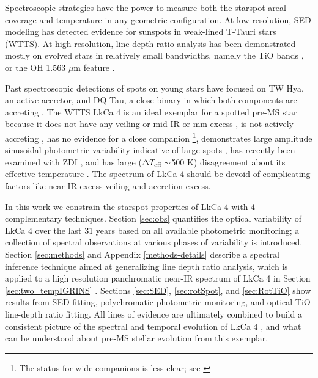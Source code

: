 \documentclass[twocolumn]{emulateapj}%
\newcommand{\name}{LkCa 4 }
\begin{document}
Spectroscopic strategies have the power to measure both the starspot areal coverage and temperature in any geometric configuration.  At low resolution, SED modeling \citep{wolk96} has detected evidence for sunspots in weak-lined T-Tauri stars (WTTS).  At high resolution, line depth ratio analysis has been demonstrated mostly on evolved stars in relatively small bandwidths, namely the TiO bands \citep{neff95,oneal96,oneal98,oneal04}, or the OH 1.563 $\mu$m feature \citep{oneal01}. 


Past spectroscopic detections of spots on young stars have focused on TW Hya, an active accretor, and DQ Tau, a close binary in which both components are accreting \citep{debes13,bary14}.  The WTTS \name \citep{herbig86,strom89a,downes88,strom89b} is an ideal exemplar for a spotted pre-MS star because it does not have any veiling \citep{hartigan95} or mid-IR or mm excess \citep{skrutskie90,andrews05,mccabe06,furlan06,luhman10,furlan11,harris12,marichalar12,howard13,buckle15}, is not actively accreting \citep{hartigan95,kenyon98,edwards06,cauley12,yang12,ardila13,castro13,loyd14,martinez15}, has no evidence for a close companion \citep{karr10,kraus11,daemgen15}\footnote{The status for wide companions is less clear; see \citet{stauffer91,itoh08,kraus09,kraus11,herczeg14}}, demonstrates large amplitude sinusoidal photometric variability indicative of large spots \citep{grankin08,xiao12}, has recently been examined with ZDI \citep{donati14}, and has large ($\Delta T_\textrm{eff} \sim$500 K) disagreement about its effective temperature \citep{herczeg14}.  The spectrum of \name should be devoid of complicating factors like near-IR excess veiling and accretion excess.

In this work we constrain the starspot properties of \name with 4 complementary techniques.  Section \ref{sec:obs} quantifies the optical variability of \name over the last 31 years based on all available photometric monitoring; a collection of spectral observations at various phases of variability is introduced.  Section \ref{sec:methods} and Appendix \ref{methods-details} describe a spectral inference technique aimed at generalizing line depth ratio analysis, which is applied to a high resolution panchromatic near-IR spectrum of \name in Section \ref{sec:two_tempIGRINS} .  Sections \ref{sec:SED}, \ref{sec:rotSpot}, and \ref{sec:RotTiO} show results from SED fitting, polychromatic photometric monitoring, and optical TiO line-depth ratio fitting.  All lines of evidence are ultimately combined to build a consistent picture of the spectral and temporal evolution of \name, and what can be understood about pre-MS stellar evolution from this exemplar.
\end{document}
